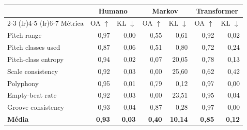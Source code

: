 \begin{tabular}{lrrrrrr}
\toprule
 & \multicolumn{2}{c}{Humano} & \multicolumn{2}{c}{Markov} & \multicolumn{2}{c}{Transformer} \\
\cmidrule(lr){2-3} \cmidrule(lr){4-5} \cmidrule(lr){6-7}
Métrica & OA $\uparrow$ & KL $\downarrow$ & OA $\uparrow$ & KL $\downarrow$ & OA $\uparrow$ & KL $\downarrow$ \\
\midrule
Pitch range & 0,97 & 0,00 & 0,55 & 0,61 & 0,92 & 0,02 \\
Pitch classes used & 0,87 & 0,06 & 0,51 & 0,80 & 0,72 & 0,24 \\
Pitch-class entropy & 0,94 & 0,02 & 0,07 & 20,05 & 0,78 & 0,13 \\
Scale consistency & 0,92 & 0,03 & 0,00 & 25,60 & 0,62 & 0,42 \\
Polyphony & 0,95 & 0,01 & 0,79 & 0,12 & 0,97 & 0,00 \\
Empty-beat rate & 0,92 & 0,03 & 0,00 & 23,51 & 0,95 & 0,04 \\
Groove consistency & 0,93 & 0,04 & 0,87 & 0,28 & 0,97 & 0,00 \\
\midrule
\textbf{Média} & \textbf{0,93} & \textbf{0,03} & \textbf{0,40} & \textbf{10,14} & \textbf{0,85} & \textbf{0,12} \\
\bottomrule
\end{tabular}

